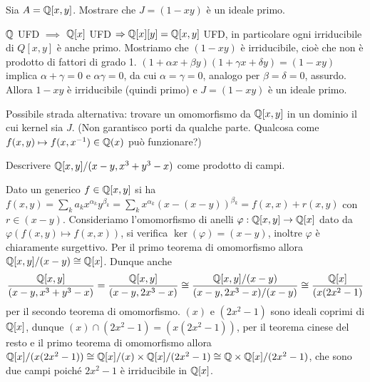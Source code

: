 \begin{exercise}
    Sia $A = \mathbb{Q}[x, y]$. Mostrare che $J = (1 - xy)$ è un ideale primo.
\end{exercise}
\begin{solution}
    $\mathbb{Q}$ UFD $\implies$ $\mathbb{Q}[x]$ UFD $\Rightarrow \mathbb{Q}[x][y] = \mathbb{Q}[x, y]$ UFD, in particolare ogni irriducibile di $Q[x, y]$ è anche primo. Mostriamo che $(1 - xy)$ è irriducibile, cioè che non è prodotto di fattori di grado 1. $(1 + \alpha x + \beta y)(1 + \gamma x + \delta y) = (1 - xy)$ implica $\alpha + \gamma = 0$ e $\alpha \gamma = 0$, da cui $\alpha = \gamma = 0$, analogo per $\beta = \delta = 0$, assurdo. Allora $1 - xy$ è irriducibile (quindi primo) e $J = (1 - xy)$ è un ideale primo.

    Possibile strada alternativa: trovare un omomorfismo da $\mathbb{Q}[x, y]$ in un dominio il cui kernel sia $J$. (Non garantisco porti da qualche parte. Qualcosa come $f(x, y) \mapsto f(x, x^{-1}) \in \mathbb{Q}(x)$ può funzionare?)
\end{solution}

\begin{exercise}
    Descrivere $\mathbb{Q}[x, y]/(x - y, x^3 + y^3 - x)$ come prodotto di campi.
\end{exercise}
\begin{solution}
    Dato un generico $f \in \mathbb{Q}[x, y]$ si ha $f(x, y) = \sum_k a_k x^{\alpha_k}y^{\beta_k} = \sum_k x^{\alpha_k} (x - (x - y))^{\beta_k} = f(x, x) + r(x, y)$ con $r \in (x - y)$. Consideriamo l'omomorfismo di anelli $\varphi : \mathbb{Q}[x, y] \to \mathbb{Q}[x]$ dato da $\varphi(f(x, y) \mapsto f(x, x))$, si verifica $\ker(\varphi) = (x - y)$, inoltre $\varphi$ è chiaramente surgettivo. Per il primo teorema di omomorfismo allora $\mathbb{Q}[x, y]/(x - y) \cong \mathbb{Q}[x]$. Dunque anche
    \[
        \frac{\mathbb{Q}[x, y]}{(x - y, x^3 + y^3 - x)} = \frac{\mathbb{Q}[x, y]}{(x - y, 2x^3 - x)} \cong \frac{\mathbb{Q}[x, y]/(x - y)}{(x - y, 2x^3 - x)/(x - y)} \cong \frac{\mathbb{Q}[x]}{(x(2x^2 - 1)}
    \]
    per il secondo teorema di omomorfismo. $(x)$ e $(2x^2 - 1)$ sono ideali coprimi di $\mathbb{Q}[x]$, dunque $(x) \cap (2x^2 - 1) = (x(2x^2 - 1))$, per il teorema cinese del resto e il primo teorema di omomorfismo allora $\mathbb{Q}[x]/(x(2x^2 - 1)) \cong \mathbb{Q}[x]/(x) \times \mathbb{Q}[x]/(2x^2 - 1) \cong \mathbb{Q} \times \mathbb{Q}[x]/(2x^2 - 1)$, che sono due campi poiché $2x^2 - 1$ è irriducibile in $\mathbb{Q}[x]$.
\end{solution}

